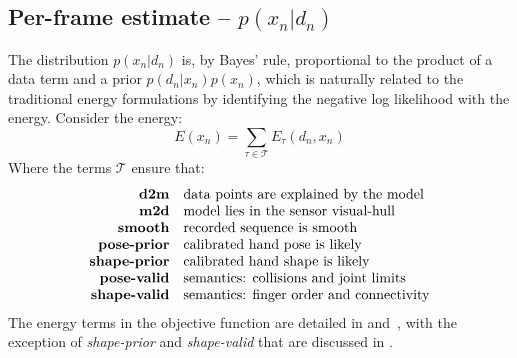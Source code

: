 
\subsection{Per-frame estimate -- $p(x_n|d_n)$}
\label{sec:independent}
\label{sec:intra}
The distribution $p(x_n|d_n)$ is, by Bayes' rule, proportional to the product of a data term and a prior $p(d_n|x_n)p(x_n)$, which is naturally related to the traditional energy formulations by identifying the negative log likelihood with the energy.  Consider the energy:
% 
\begin{equation}
E(x_n) = \sum_{\tau \in \mathcal{T}} E_{\tau}(d_n, x_n) 
\label{eq:energies}
\end{equation}
% 
Where the terms $\mathcal{T}$ ensure that:
%
\begin{equation*}
\setlength{\jot}{0pt}
\begin{aligned}
\text{\textbf{d2m}} & \quad \text{data points are explained by the model} \\ 
\text{\textbf{m2d}} & \quad \text{model lies in the sensor visual-hull} \\
\text{\textbf{smooth}} & \quad \text{recorded sequence is smooth} \\
\text{\textbf{pose-prior}} & \quad \text{calibrated hand pose is likely} \\
\text{\textbf{shape-prior}} & \quad \text{calibrated hand shape is likely} \\
\text{\textbf{pose-valid}} & \quad \text{semantics: collisions and joint limits} \\
\text{\textbf{shape-valid}} & \quad \text{semantics: finger order and connectivity}
\end{aligned}
\end{equation*}
The energy terms in the objective function are detailed in \cite{tkach2016sphere} and~\cite{tagliasacchi2015robust}, with the exception of \emph{shape-prior} and \emph{shape-valid} that are discussed in .
% 
